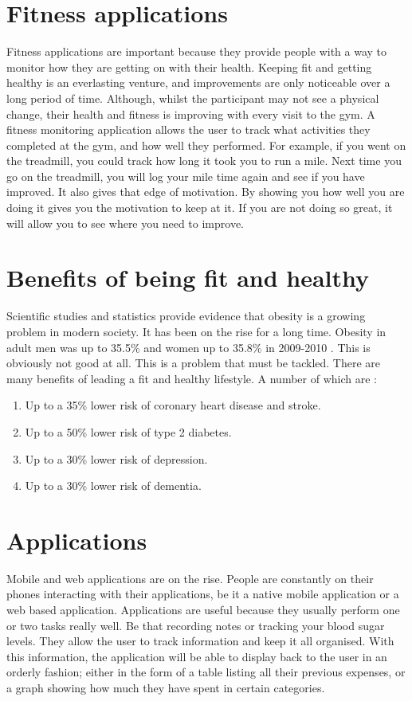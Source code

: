 \section{Fitness applications}
Fitness applications are important because they provide people with a way to monitor how they are getting on with their health. Keeping fit and getting healthy is an everlasting venture, and improvements are only noticeable over a long period of time. Although, whilst the participant may not see a physical change, their health and fitness is improving with every visit to the gym. A fitness monitoring application allows the user to track what activities they completed at the gym, and how well they performed. For example, if you went on the treadmill, you could track how long it took you to run a mile. Next time you go on the treadmill, you will log your mile time again and see if you have improved. It also gives that edge of motivation. By showing you how well you are doing it gives you the motivation to keep at it. If you are not doing so great, it will allow you to see where you need to improve.\\

\section{Benefits of being fit and healthy}
Scientific studies and statistics provide evidence that obesity is a growing problem in modern society. It has been on the rise for a long time. Obesity in adult men was up to 35.5\% and women up to 35.8\% in 2009-2010 \citep{doi:10.1001}. This is obviously not good at all. This is a problem that must be tackled. There are many benefits of leading a fit and healthy lifestyle. A number of which are \citep{nhs:2013}:

\begin{enumerate}
\item {Up to a 35\% lower risk of coronary heart disease and stroke.}
\item {Up to a 50\% lower risk of type 2 diabetes.}
\item {Up to a 30\% lower risk of depression.}
\item {Up to a 30\% lower risk of dementia.}
\end{enumerate}

\section{Applications}
Mobile and web applications are on the rise. People are constantly on their phones interacting with their applications, be it a native mobile application or a web based application. Applications are useful because they usually perform one or two tasks really well. Be that recording notes or tracking your blood sugar levels. They allow the user to track information and keep it all organised. With this information, the application will be able to display back to the user in an orderly fashion; either in the form of a table listing all their previous expenses, or a graph showing how much they have spent in certain categories.

